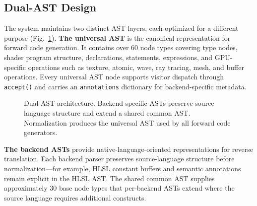 \documentclass{svproc}
\begin{document}
\subsection{Dual-AST Design}

The system maintains two distinct AST layers, each optimized for a different purpose (Fig.~\ref{fig:dualast}). \textbf{The universal AST} is the canonical representation for forward code generation. It contains over 60 node types covering type nodes, shader program structure, declarations, statements, expressions, and GPU-specific operations such as texture, atomic, wave, ray tracing, mesh, and buffer operations. Every universal AST node supports visitor dispatch through \texttt{accept()} and carries an \texttt{annotations} dictionary for backend-specific metadata.

\begin{figure}[t]
\centering
{}
\caption{Dual-AST architecture. Backend-specific ASTs preserve source language structure and extend a shared common AST. Normalization produces the universal AST used by all forward code generators.}
\label{fig:dualast}
\end{figure}

\textbf{The backend ASTs} provide native-language-oriented representations for reverse translation. Each backend parser preserves source-language structure before normalization---for example, HLSL constant buffers and semantic annotations remain explicit in the HLSL AST. The shared common AST supplies approximately 30 base node types that per-backend ASTs extend where the source language requires additional constructs.
\end{document}
